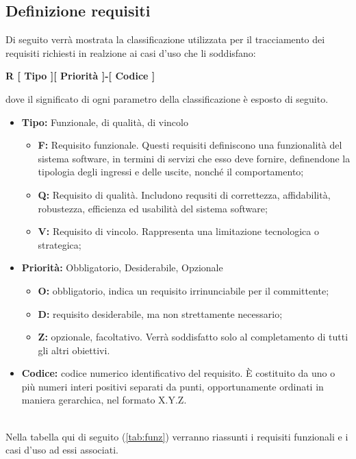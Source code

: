 \clearpage
\subsection{Definizione requisiti}
Di seguito verrà mostrata la classificazione utilizzata per il tracciamento dei requisiti richiesti in realzione ai casi d'uso che li soddisfano: 
\begin{center}
    \textbf{R [ Tipo ][ Priorità ]-[ Codice ]}
\end{center}
dove il significato di ogni parametro della classificazione è esposto di seguito.
\begin{itemize}
    \item \textbf{Tipo:} Funzionale, di qualità, di vincolo
    \begin{itemize}
        \item \textbf{F:} Requisito funzionale. Questi requisiti definiscono una funzionalità del sistema software, in termini di servizi che esso deve fornire, definendone la tipologia degli ingressi e delle uscite, nonché il comportamento;
        \item \textbf{Q:} Requisito di qualità. Includono requsiti di correttezza, affidabilità, robustezza, efficienza ed usabilità del sistema software;
        \item \textbf{V:} Requisito di vincolo. Rappresenta una limitazione tecnologica o strategica;
    \end{itemize}
    \item \textbf{Priorità:} Obbligatorio, Desiderabile, Opzionale  
    \begin{itemize}
        \item \textbf{O:} obbligatorio, indica un requisito irrinunciabile per il committente;
        \item \textbf{D:} requisito desiderabile, ma non strettamente necessario;
        \item \textbf{Z:} opzionale, facoltativo. Verrà soddisfatto solo al
completamento di tutti gli altri obiettivi.
    \end{itemize}
    \item \textbf{Codice:} codice numerico identificativo del requisito. È costituito da uno o più numeri
interi positivi separati da punti, opportunamente ordinati in maniera gerarchica, nel formato
X.Y.Z.  
\end{itemize}

\ \\
Nella tabella qui di seguito (\ref{tab:funz}) verranno riassunti i requisiti funzionali e i casi d'uso ad essi associati. 

